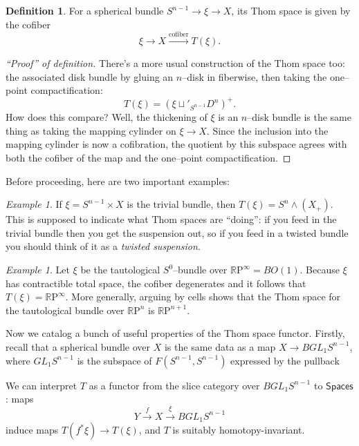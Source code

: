 \documentclass{amsart}
\newcommand{\R}{\mathbb R}
\newcommand{\RP}{\R\mathrm P}
\newcommand{\<}{\langle}
\renewcommand{\>}{\rangle}
\newcommand{\sm}{\wedge}
\newcommand{\CatOf}[1]{\mathsf{#1}}
\newcommand{\GL}{\mathit{GL}}
\DeclareMathOperator{\End}{End}
\DeclareMathOperator{\Aut}{Aut}
\numberwithin{equation}{section}
\theoremstyle{plain}
\theoremstyle{definition}
\newtheorem{definition}[equation]{Definition}
\theoremstyle{remark}
\newtheorem{example}[equation]{Example}
\begin{document}
\begin{definition}
For a spherical bundle $S^{n-1} \to \xi \to X$, its Thom space is given by the cofiber \[\xi \to X \xrightarrow{\text{cofiber}} T(\xi).\]
\end{definition}
\begin{proof}[``Proof'' of definition]
There's a more usual construction of the Thom space too: the associated disk bundle by gluing an $n$--disk in fiberwise, then taking the one--point compactification: \[T(\xi) = (\xi \sqcup'_{S^{n-1}} D^n)^+.\] How does this compare? Well, the thickening of $\xi$ is an $n$--disk bundle is the same thing as taking the mapping cylinder on $\xi \to X$. Since the inclusion into the mapping cylinder is now a cofibration, the quotient by this subspace agrees with both the cofiber of the map and the one--point compactification.
\end{proof}

Before proceeding, here are two important examples:
\begin{example}
If $\xi = S^{n-1} \times X$ is the trivial bundle, then $T(\xi) = S^n \sm (X_+)$.  This is supposed to indicate what Thom spaces are ``doing'': if you feed in the trivial bundle then you get the suspension out, so if you feed in a twisted bundle you should think of it as a \textit{twisted suspension}.
\end{example}

\begin{example}
Let $\xi$ be the tautological $S^0$--bundle over $\RP^\infty = BO(1)$.  Because $\xi$ has contractible total space, the cofiber degenerates and it follows that $T(\xi) = \RP^\infty$. More generally, arguing by cells shows that the Thom space for the tautological bundle over $\RP^n$ is $\RP^{n+1}$.
\end{example}

Now we catalog a bunch of useful properties of the Thom space functor. Firstly, recall that a spherical bundle over $X$ is the same data as a map $X \to B \GL_1 S^{n-1}$, where $\GL_1 S^{n-1}$ is the subspace of $F(S^{n-1}, S^{n-1})$ expressed by the pullback
\begin{center}
\end{center}
We can interpret $T$ as a functor from the slice category over $BGL_1 S^{n-1}$ to $\CatOf{Spaces}$: maps \[Y \xrightarrow{f} X \xrightarrow{\xi} B \GL_1 S^{n-1}\] induce maps $T(f^* \xi) \to T(\xi)$, and $T$ is suitably homotopy-invariant.
\end{document}
